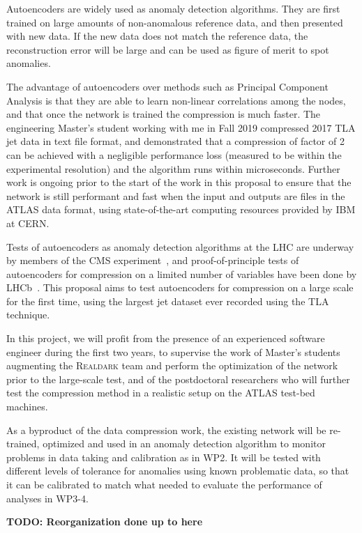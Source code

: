 

Autoencoders are widely used as anomaly detection algorithms. They are first trained on large amounts of non-anomalous reference data, and then presented with new data. If the new data does not match the reference data, the reconstruction error will be large and can be used as figure of merit to spot anomalies. 

The advantage of autoencoders over methods such as Principal Component Analysis is that they are able to learn non-linear correlations among the nodes, and that once the network is trained the compression is much faster. 
The engineering Master’s student working with me in Fall 2019 compressed 2017 TLA jet data in text file format, and demonstrated that a compression of factor of 2 can be achieved with a negligible performance loss (measured to be within the experimental resolution) and the algorithm runs within microseconds. Further work is ongoing prior to the start of the work in this proposal to ensure that the network is still performant and fast when the input and outputs are files in the ATLAS data format, using state-of-the-art computing resources provided by IBM at CERN. 

Tests of autoencoders as anomaly detection algorithms at the LHC are underway by members of the CMS experiment~\cite{CMSAE}, and proof-of-principle tests of autoencoders for compression on a limited number of variables  have been done by LHCb~\cite{ref:lhcb_ae}. 
This proposal aims to test autoencoders for compression on a large scale for the first time, using the largest jet dataset ever recorded using the TLA technique.

In this project, we will profit from the presence of an experienced software engineer during the first two years, to supervise the work of Master’s students augmenting the \textsc{Realdark} team and perform the optimization of the network prior to the large-scale test, and of the postdoctoral researchers who will further test the compression method in a realistic setup on the ATLAS test-bed machines. 

As a byproduct of the data compression work, the existing network will be re-trained, optimized and used in an anomaly detection algorithm to monitor problems in data taking and calibration as in WP2. It will be tested with different levels of tolerance for anomalies using known problematic data, so that it can be calibrated to match what needed to evaluate the performance of analyses in WP3-4. 




\color{red}\textbf{TODO: Reorganization done up to here}\color{black}


